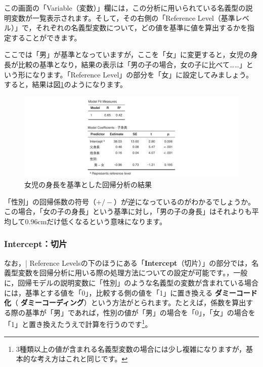 \documentclass[
  12pt,
  a5jpaper,
  lualatex, ja=standard]{bxjsbook}
\renewcommand{\emph}[1]{\textbf{\color{emph} #1}}
\begin{document}
この画面の「Variable（変数）」欄には，この分析に用いられている名義型の説明変数が一覧表示されます。そして，その右側の「Reference Level（基準レベル）」で，それぞれの名義型変数について，どの値を基準に値を算出するかを指定することができます。

ここでは「男」が基準となっていますが，ここを「女」に変更すると，女児の身長が比較の基準となり，結果の表示は「男の子の場合，女の子に比べて\ldots\ldots」という形になります。「Reference Level」の部分を「女」に設定してみましょう。すると，結果は図\ref{fig:regression-lr-reference-levels-F}のようになります。

\begin{figure}[!ht]

{\centering \includegraphics[width=1\linewidth]{images/regression/lr-reference-levels-F} 

}

\caption{女児の身長を基準とした回帰分析の結果}\label{fig:regression-lr-reference-levels-F}
\end{figure}

「性別」の回帰係数の符号（\(+/-\)）が逆になっているのがわかるでしょうか。この場合，「女の子の身長」という基準に対し，「男の子の身長」はそれよりも平均して0.96cmだけ低くなるという意味になります。

\hypertarget{interceptux5207ux7247}{%
\subsubsection*{Intercept：切片}\label{interceptux5207ux7247}}

なお，\colorbox{bar}{\textcolor{gmoji2}{| Reference Levels}}の下のほうにある「\textbf{Intercept}（切片）」の部分では，名義型変数を回帰分析に用いる際の処理方法についての設定が可能です。，一般に，回帰モデルの説明変数に「性別」のような名義型の変数が含まれている場合には，基準とする値を「0」，比較する側の値を「1」に置き換える\emph{ダミーコード化}（\emph{ダミーコーディング}）という方法がとられます。たとえば，係数を算出する際の基準が「男」であれば，性別の値が「男」の場合を「0」，「女」の場合を「1」と置き換えたうえで計算を行うのです\footnote{3種類以上の値が含まれる名義型変数の場合には少し複雑になりますが，基本的な考え方はこれと同じです。}。
\end{document}
